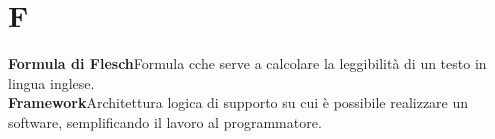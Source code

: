 \newpage
\section{F}\label{l:F}

\textbf{Formula di Flesch}\newline Formula cche serve a calcolare la leggibilità di un testo in lingua inglese.\\
\newline
\textbf{Framework}\newline Architettura logica di supporto su cui è possibile realizzare un software, semplificando il lavoro al programmatore.